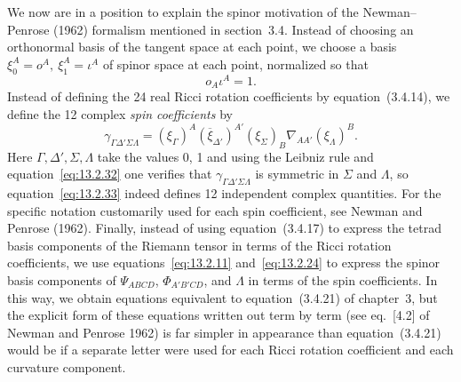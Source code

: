 We now are in a position to explain the spinor motivation of the Newman--Penrose
(1962) formalism mentioned in section~3.4. Instead of choosing an orthonormal basis
of the tangent space at each point, we choose a basis
\(\xi_0^A=o^A,\ \xi_1^A=\iota^A\) of spinor space at each point, normalized so that
\begin{equation}
  o_A\iota^A=1.
  \tag{13.2.32}\label{eq:13.2.32}
\end{equation}
Instead of defining the 24 real Ricci rotation coefficients by equation~(3.4.14), we
define the 12 complex \emph{spin coefficients} by
\begin{equation}
  \gamma_{\Gamma\Delta'\Sigma\Lambda}
  =(\xi_\Gamma)^A(\overline\xi_{\Delta'})^{A'}(\xi_\Sigma)_B
    \nabla_{AA'}(\xi_\Lambda)^B.
  \tag{13.2.33}\label{eq:13.2.33}
\end{equation}
Here \(\Gamma,\Delta',\Sigma,\Lambda\) take the values 0, 1 and using the Leibniz
rule and equation~\eqref{eq:13.2.32} one verifies that
\(\gamma_{\Gamma\Delta'\Sigma\Lambda}\) is symmetric in \(\Sigma\) and \(\Lambda\),
so equation~\eqref{eq:13.2.33} indeed defines 12 independent complex quantities.
For the specific notation customarily used for each spin coefficient, see Newman and
Penrose (1962). Finally, instead of using equation~(3.4.17) to express the tetrad
basis components of the Riemann tensor in terms of the Ricci rotation coefficients,
we use equations~\eqref{eq:13.2.11} and~\eqref{eq:13.2.24} to express the spinor
basis components of \(\Psi_{ABCD}\), \(\Phi_{A'B'CD}\), and \(\Lambda\) in terms of
the spin coefficients. In this way, we obtain equations equivalent to
equation~(3.4.21) of chapter~3, but the explicit form of these equations written out
term by term (see eq.~[4.2] of Newman and Penrose 1962) is far simpler in appearance
than equation~(3.4.21) would be if a separate letter were used for each Ricci
rotation coefficient and each curvature component.

